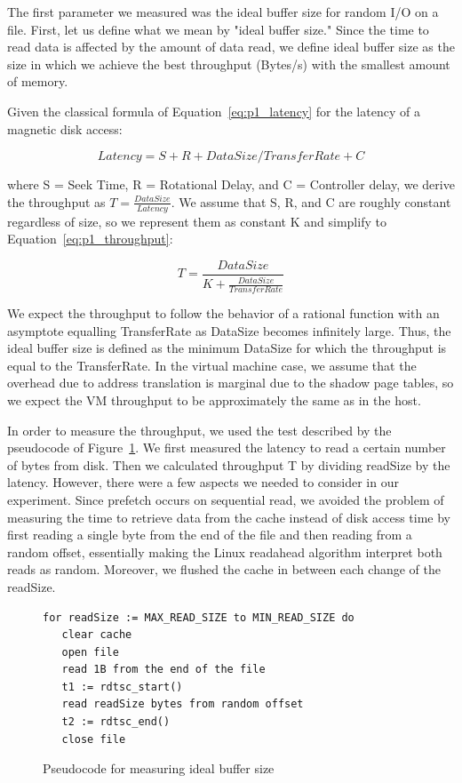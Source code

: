 The first parameter we measured was the ideal buffer size for random I/O 
on a file. First, let us define what we mean by "ideal buffer size." Since
the time to read data is affected by the amount of data read, we define ideal
buffer size as the size in which we achieve the best throughput (Bytes/s)
with the smallest amount of memory. 

Given the classical formula of Equation~\ref{eq:p1_latency} for the latency 
of a magnetic disk access:

\begin{equation}\label{eq:p1_latency}
Latency = S + R + DataSize/TransferRate + C
\end{equation}

where S = Seek Time, R = Rotational Delay, and C = Controller delay, we 
derive the throughput as $T = \frac{DataSize}{Latency}$. We assume that S, R, 
and C are roughly constant regardless of size, so we represent them as constant K and simplify to Equation~\ref{eq:p1_throughput}:

\begin{equation}\label{eq:p1_throughput}
T = \frac{DataSize}{K + \frac{DataSize}{TransferRate}}
\end{equation}

We expect the throughput to follow the behavior of a rational function
with an asymptote equalling TransferRate as DataSize becomes infinitely large.
Thus, the ideal buffer size is defined as the minimum DataSize for which the 
throughput is equal to the TransferRate. In the virtual machine case, we assume 
that the overhead due to address translation is marginal due to the shadow page 
tables, so we expect the VM throughput to be approximately the same as in the host.

In order to measure the throughput, we used the test described by the pseudocode 
of Figure~\ref{fig:p1code}. We first measured the latency to read a
certain number of bytes from disk. Then we calculated throughput T by dividing 
readSize by the latency. However, there were a few aspects we needed 
to consider in our experiment. Since prefetch occurs on sequential read, 
we avoided the problem of measuring the time to retrieve data from the cache instead
of disk access time by first reading a single byte from the end of the file
and then reading from a random offset, essentially making the Linux readahead
algorithm interpret both reads as random. Moreover, we flushed the cache in
between each change of the readSize. 

\begin{figure}[h!]
\begin{lstlisting}
for readSize := MAX_READ_SIZE to MIN_READ_SIZE do
   clear cache
   open file
   read 1B from the end of the file
   t1 := rdtsc_start()
   read readSize bytes from random offset 
   t2 := rdtsc_end()
   close file
\end{lstlisting} 
\caption{Pseudocode for measuring ideal buffer size}
\label{fig:p1code}
\end{figure}

